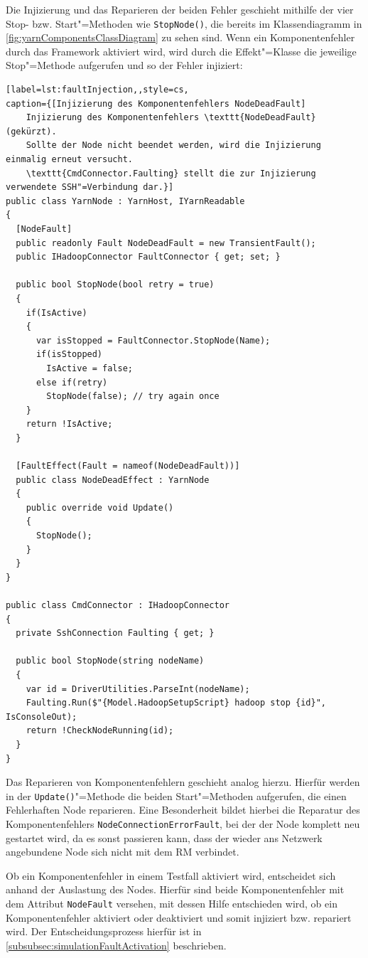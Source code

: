 Die Injizierung und das Reparieren der beiden Fehler geschieht mithilfe der vier Stop- bzw. Start"=Methoden wie \zB \texttt{StopNode()}, die bereits im Klassendiagramm in \cref{fig:yarnComponentsClassDiagram} zu sehen sind.
Wenn ein Komponentenfehler durch das Framework aktiviert wird, wird durch die Effekt"=Klasse die jeweilige Stop"=Methode aufgerufen und so der Fehler injiziert:

\begin{lstlisting}[label=lst:faultInjection,,style=cs,
caption={[Injizierung des Komponentenfehlers NodeDeadFault]
    Injizierung des Komponentenfehlers \texttt{NodeDeadFault} (gekürzt).
    Sollte der Node nicht beendet werden, wird die Injizierung einmalig erneut versucht.
    \texttt{CmdConnector.Faulting} stellt die zur Injizierung verwendete SSH"=Verbindung dar.}]
public class YarnNode : YarnHost, IYarnReadable
{
  [NodeFault]
  public readonly Fault NodeDeadFault = new TransientFault();
  public IHadoopConnector FaultConnector { get; set; }
  
  public bool StopNode(bool retry = true)
  {
    if(IsActive)
    {
      var isStopped = FaultConnector.StopNode(Name);
      if(isStopped)
        IsActive = false;
      else if(retry)
        StopNode(false); // try again once
    }
    return !IsActive;
  }
  
  [FaultEffect(Fault = nameof(NodeDeadFault))]
  public class NodeDeadEffect : YarnNode
  {
    public override void Update()
    {
      StopNode();
    }
  }
}

public class CmdConnector : IHadoopConnector
{
  private SshConnection Faulting { get; }
  
  public bool StopNode(string nodeName)
  {
    var id = DriverUtilities.ParseInt(nodeName);
    Faulting.Run($"{Model.HadoopSetupScript} hadoop stop {id}", IsConsoleOut);
    return !CheckNodeRunning(id);
  }
}
\end{lstlisting}

Das Reparieren von Komponentenfehlern geschieht analog hierzu.
Hierfür werden in der \texttt{Update()}"=Methode die beiden Start"=Methoden aufgerufen, die einen Fehlerhaften Node reparieren.
Eine Besonderheit bildet hierbei die Reparatur des Komponentenfehlers \texttt{NodeConnectionErrorFault}, bei der der Node komplett neu gestartet wird, da es sonst passieren kann, dass der wieder ans Netzwerk angebundene Node sich nicht mit dem \ac{RM} verbindet.

Ob ein Komponentenfehler in einem Testfall aktiviert wird, entscheidet sich anhand der Auslastung des Nodes.
Hierfür sind beide Komponentenfehler mit dem Attribut \texttt{NodeFault} versehen, mit dessen Hilfe entschieden wird, ob ein Komponentenfehler aktiviert oder deaktiviert und somit injiziert bzw. repariert wird.
Der Entscheidungsprozess hierfür ist in \cref{subsubsec:simulationFaultActivation} beschrieben.

